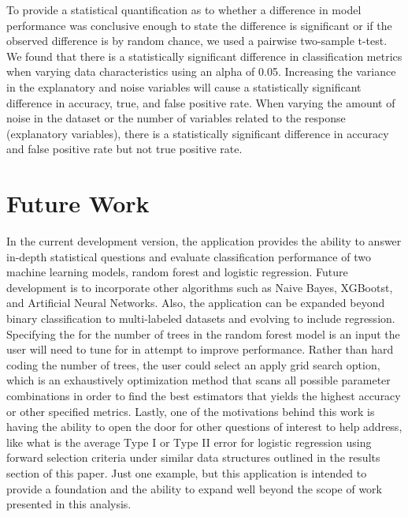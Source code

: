 \documentclass{llncs}
\begin{document}
To provide a statistical quantification as to whether a difference in model performance was conclusive enough to state the difference is significant or if the observed difference is by random chance, we used a pairwise two-sample t-test.  We found that there is a statistically significant difference in classification metrics when varying data characteristics using an alpha of 0.05. Increasing the variance in the explanatory and noise variables will cause a statistically significant difference in accuracy, true, and false positive rate.  When varying the amount of noise in the dataset or the number of variables related to the response (explanatory variables), there is a statistically significant difference in accuracy and false positive rate but not true positive rate.
  

\section{Future Work}
\noindent 

In the current development version, the application provides the ability to answer in-depth statistical questions and evaluate classification performance of two machine learning models, random forest and logistic regression. Future development is to incorporate other algorithms such as Naive Bayes, XGBootst, and Artificial Neural Networks. Also, the application can be expanded beyond binary classification to multi-labeled datasets and evolving to include regression. Specifying the for the number of trees in the random forest model is an input the user will need to tune for in attempt to improve performance. Rather than hard coding the number of trees, the user could select an apply grid search option, which is an exhaustively optimization method that scans all possible parameter combinations in order to find the best estimators that yields the highest accuracy or other specified metrics. Lastly, one of the motivations behind this work is having the ability to open the door for other questions of interest to help address, like what is the average Type I or Type II error for logistic regression using forward selection criteria under similar data structures outlined in the results section of this paper. Just one example, but this application is intended to provide a foundation and the ability to expand well beyond the scope of work presented in this analysis.
\end{document}
